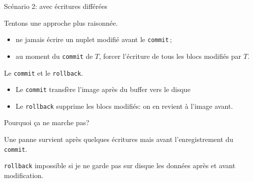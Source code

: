 \begin{frame}{Scénario 2: avec écritures différées}

Tentons une approche plus raisonnée.

\begin{itemize}
  \item ne \alert{jamais} écrire un nuplet
modifié \alert{avant} le \texttt{commit}\,; 
  \item au moment
du \texttt{commit} de $T$, forcer l'écriture de \alert{tous} les blocs modifiés
par $T$.
\end{itemize}

\vfill
Le \texttt{commit} et le \texttt{rollback}.

\vfill

\begin{block}{}

\begin{itemize}
\item Le \texttt{commit} transfère l'image après du buffer vers le disque

\item Le \texttt{rollback} supprime les blocs modifiés: on en revient à l'image avant.
\end{itemize}

\end{block}

\end{frame}


\begin{frame}{Pourquoi ça ne marche pas?}

Une panne  survient
      \alert{après}
         quelques écritures mais \alert{avant} l'enregistrement 
        du \texttt{commit}.

\vfill
     

\vfill

\begin{block}{}
\texttt{rollback} impossible si je ne garde pas
\alert{sur disque} les données \alert{après} et \alert{avant} modification.
\end{block}
\end{frame}

